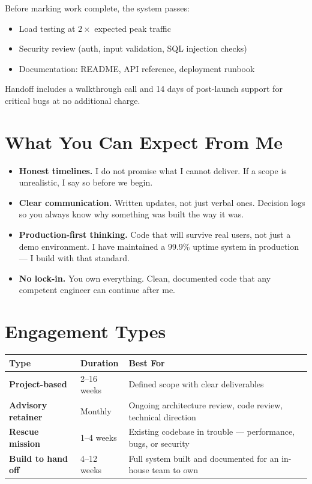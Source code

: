 \documentclass[11pt,a4paper]{article}
\begin{document}
Before marking work complete, the system passes:
\begin{itemize}
  \item Load testing at $2\times$ expected peak traffic
  \item Security review (auth, input validation, SQL injection checks)
  \item Documentation: README, API reference, deployment runbook
\end{itemize}

Handoff includes a walkthrough call and 14 days of post-launch support for critical bugs at no additional charge.

\section{What You Can Expect From Me}

\begin{itemize}
  \item \textbf{Honest timelines.} I do not promise what I cannot deliver. If a scope is unrealistic, I say so before we begin.
  \item \textbf{Clear communication.} Written updates, not just verbal ones. Decision logs so you always know why something was built the way it was.
  \item \textbf{Production-first thinking.} Code that will survive real users, not just a demo environment. I have maintained a 99.9\% uptime system in production — I build with that standard.
  \item \textbf{No lock-in.} You own everything. Clean, documented code that any competent engineer can continue after me.
\end{itemize}

\section{Engagement Types}

\begin{tabularx}{\linewidth}{@{} l l X @{}}
  \toprule
  \rowcolor{brand!8}
  \textbf{Type} & \textbf{Duration} & \textbf{Best For} \\
  \midrule
  \textbf{Project-based}   & 2--16 weeks  & Defined scope with clear deliverables \\
  \addlinespace[0.2em]
  \textbf{Advisory retainer} & Monthly      & Ongoing architecture review, code review, technical direction \\
  \addlinespace[0.2em]
  \textbf{Rescue mission}  & 1--4 weeks   & Existing codebase in trouble — performance, bugs, or security \\
  \addlinespace[0.2em]
  \textbf{Build to hand off} & 4--12 weeks & Full system built and documented for an in-house team to own \\
  \bottomrule
\end{tabularx}
\end{document}
